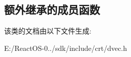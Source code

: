 \subsection*{额外继承的成员函数}


该类的文档由以下文件生成\+:\begin{DoxyCompactItemize}
\item 
E\+:/\+React\+O\+S-\/0../sdk/include/crt/dvec.\+h\end{DoxyCompactItemize}
